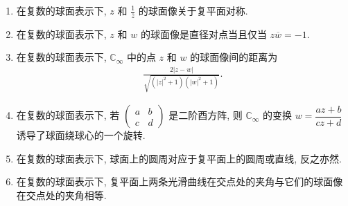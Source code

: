 \documentclass[../../main.tex]{subfiles}%
\begin{document}
\begin{proposition}\label{proposition:扩充复球面的一些基本性质}
\begin{enumerate}[(1)]
\item\label{proposition:扩充复球面的一些基本性质-1} 在复数的球面表示下, $z$ 和 $\frac{1}{\overline{z}}$ 的球面像关于复平面对称.

\item\label{proposition:扩充复球面的一些基本性质-2} 在复数的球面表示下, $z$ 和 $w$ 的球面像是直径对点当且仅当 $z\overline{w}=-1$.

\item\label{proposition:扩充复球面的一些基本性质-3} 在复数的球面表示下, $\mathbb{C}_\infty$ 中的点 $z$ 和 $w$ 的球面像间的距离为
\begin{align*}
\frac{2|z-w|}{\sqrt{(|z|^2+1)(|w|^2+1)}}.
\end{align*}

\item\label{proposition:扩充复球面的一些基本性质-4} 在复数的球面表示下, 若 $\begin{pmatrix} a & b \\ c & d \end{pmatrix}$ 是二阶酉方阵, 则 $\mathbb{C}_\infty$ 的变换 $w=\dfrac{az+b}{cz+d}$ 诱导了球面绕球心的一个旋转.

\item\label{proposition:扩充复球面的一些基本性质-5} 在复数的球面表示下, 球面上的圆周对应于复平面上的圆周或直线, 反之亦然.

\item\label{proposition:扩充复球面的一些基本性质-6} 在复数的球面表示下, 复平面上两条光滑曲线在交点处的夹角与它们的球面像在交点处的夹角相等.
\end{enumerate}
\end{proposition}
\end{document}
